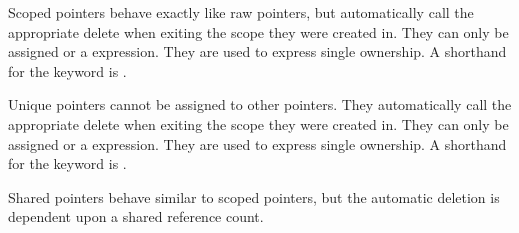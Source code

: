 \pnum
{}%
Scoped pointers behave exactly like raw pointers, but automatically call the appropriate delete when exiting the scope they were created in. They can only be assigned  or a  expression. They are used to express single ownership. A shorthand for the  keyword is \tcode{!}.

\pnum
{}%
Unique pointers cannot be assigned to other pointers. They automatically call the appropriate delete when exiting the scope they were created in. They can only be assigned  or a  expression. They are used to express single ownership. A shorthand for the  keyword is \tcode{\^}.

\pnum
{}%
Shared pointers behave similar to scoped pointers, but the automatic deletion is dependent upon a shared reference count. 